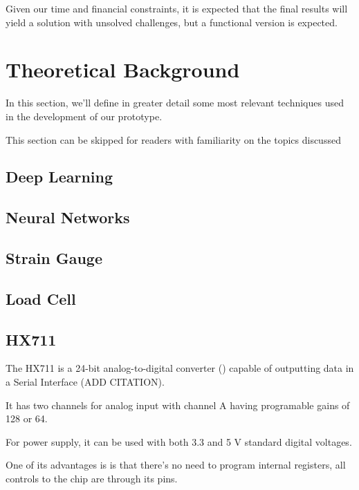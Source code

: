 \documentclass[openright]{normas-utf-tex} %
\begin{document}
Given our time and financial constraints, it is expected that the final results will yield
a solution with unsolved challenges, but a functional version is expected.

\chapter{Theoretical Background}

In this section, we'll define in greater detail some most relevant techniques
used in the development of our prototype.

This section can be skipped for readers with familiarity on the topics discussed

\section{Deep Learning}

\section{Neural Networks}

\section{Strain Gauge}

\section{Load Cell}

\section{HX711}

The HX711 is a 24-bit analog-to-digital converter ()
capable of outputting data in a Serial Interface (ADD CITATION).

It has two channels for analog input with channel A having programable gains of 128 or 64.

For power supply, it can be used with both 3.3 and 5 V standard digital voltages.

One of its advantages is is that there's no need to program internal registers, all
controls to the chip are through its pins.
\end{document}
